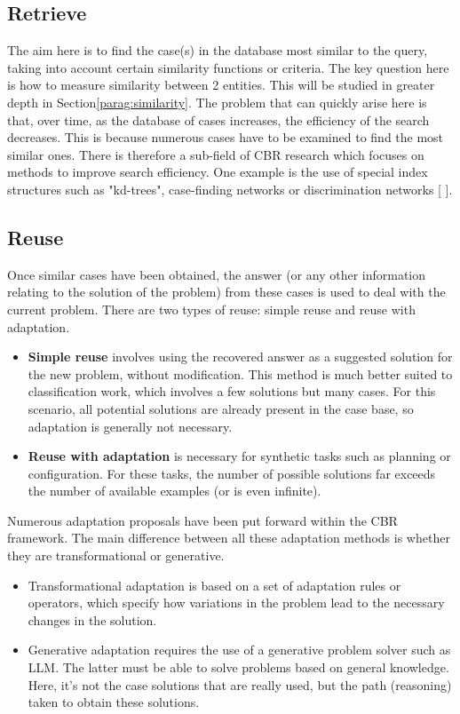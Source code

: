     \subsection{Retrieve}
    The aim here is to find the case(s) in the database most similar to the query, taking into account certain similarity functions or criteria. The key question here is how to measure similarity between 2 entities. This will be studied in greater depth in Section\ref{parag:similarity}. The problem that can quickly arise here is that, over time, as the database of cases increases, the efficiency of the search decreases. This is because numerous cases have to be examined to find the most similar ones. There is therefore a sub-field of CBR research which focuses on methods to improve search efficiency. One example is the use of special index structures such as "kd-trees", case-finding networks or discrimination networks [ ].
    
    \subsection{Reuse}
    Once similar cases have been obtained, the answer (or any other information relating to the solution of the problem) from these cases is used to deal with the current problem. There are two types of reuse: simple reuse and reuse with adaptation. 
    
    \begin{itemize}
        \item \textbf{Simple reuse} involves using the recovered answer as a suggested solution for the new problem, without modification. This method is much better suited to classification work, which involves a few solutions but many cases.  For this scenario, all potential solutions are already present in the case base, so adaptation is generally not necessary. 
        
        \item \textbf{Reuse with adaptation} is necessary for synthetic tasks such as planning or configuration. For these tasks, the number of possible solutions far exceeds the number of available examples (or is even infinite).
    \end{itemize}

    Numerous adaptation proposals have been put forward within the CBR framework. The main difference between all these adaptation methods is whether they are transformational or generative.
    
    \begin{itemize}
        \item Transformational adaptation is based on a set of adaptation rules or operators, which specify how variations in the problem lead to the necessary changes in the solution.  
        
        \item Generative adaptation requires the use of a generative problem solver such as LLM. The latter must be able to solve problems based on general knowledge. Here, it's not the case solutions that are really used, but the path (reasoning) taken to obtain these solutions. 
    \end{itemize}

